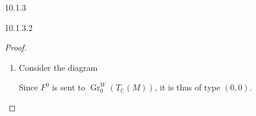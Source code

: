 \begin{construction}{10.1.3}
\begin{lemma}{10.1.3.2}
\begin{proof}
\begin{enumerate}
          
 \item[(c)]
            Consider the diagram
            

            Since \(F^0\) is sent to \(\operatorname {Gr}_0^W(T_\mathbb {C}(M))\), it is thus of type \((0,0)\).
          


\end{enumerate}
\end{proof}
\end{lemma}
\end{construction}
